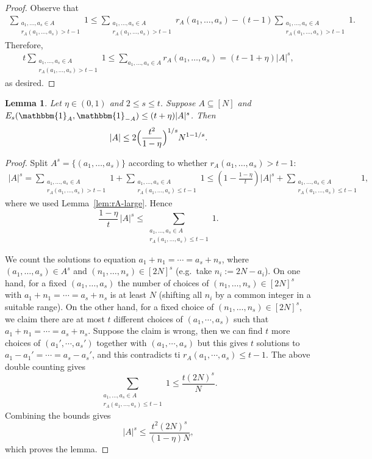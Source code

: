 \documentclass[A4paper,reqno,oneside,12pt]{amsart}
\theoremstyle{plain}
\newtheorem{lemma}[theorem]{Lemma}
\theoremstyle{definition}
\newcommand{\e}{\mathbbm{1}}          %
\begin{document}
\begin{proof}
Observe that
\begin{align*}
  \sum_{\substack{a_1,\dots,a_s\in A\\ r_{A}(a_1,\dots,a_s)>t-1}} 1 \leq \sum_{\substack{a_1,\dots,a_s\in A\\ r_{A}(a_1,\dots,a_s)>t-1}} r_A(a_1,\dots,a_s) -(t-1)\sum_{\substack{a_1,\dots,a_s\in A\\ r_{A}(a_1,\dots,a_s)>t-1}} 1.
\end{align*}
Therefore,
\begin{align*}
t\sum_{\substack{a_1,\dots,a_s\in A\\ r_{A}(a_1,\dots,a_s)>t-1}} 1 \leq \sum_{a_1,\dots,a_s\in A} r_A(a_1,\dots,a_s)=(t-1+\eta)|A|^s,
\end{align*}
as desired.
\end{proof}

\begin{lemma}\label{lem: upper bound on A} Let $\eta\in(0,1)$  and $2\le s\le t$.
Suppose $A\subseteq [N]$ and $E_s(\e_A,\e_{-A})\leq (t+\eta)|A|^s$. Then
\[
|A|\leq 2\Bigl(\frac{t^2}{1-\eta}\Bigr)^{1/s}N^{1-1/s}.
\]
\end{lemma}

\begin{proof}
Split $A^s=\{(a_1, \dots, a_s)\}$ according to whether $r_A(a_1,\dots,a_s)>t-1$:
\begin{align*}
|A|^{s} =\sum_{\substack{a_1,\dots,a_s\in A\\ r_A(a_1,\dots,a_s)>t-1}} 1
+\sum_{\substack{a_1,\dots,a_s\in A\\ r_A(a_1,\dots,a_s)\le t-1}} 1 \le \left(1-\frac{1-\eta}{t}\right) |A|^{s}
+\sum_{\substack{a_1,\dots,a_s\in A\\ r_A(a_1,\dots,a_s)\le t-1}} 1,
\end{align*}
where we used Lemma~\ref{lem:rA-large}. Hence
\[
\frac{1-\eta}{t}\,|A|^s
\le \sum_{\substack{a_1,\dots,a_s\in A\\ r_A(a_1,\dots,a_s)\le t-1}} 1.
\]

We count the solutions to 
equation $a_1+n_1=\cdots=a_s+n_s$, where $(a_1,\dots,a_s)\in A^s$ and $(n_1,\dots,n_s)\in [2N]^s$ 
(e.g.\ take $n_i:=2N-a_i$).
On one hand, for a fixed $(a_1,\dots,a_s)$ the number of choices of $(n_1,\dots,n_s)\in [2N]^{s}$ with $a_1+n_1=\cdots=a_s+n_s$ is at least $N$ (shifting all $n_i$ by a common integer in a suitable range). On the other hand, for a fixed choice of $(n_1,\dots,n_s)\in [2N]^{s}$, we claim there are at most $t$ different choices of $(a_1, \cdots, a_s)$ such that $a_1+n_1 = \cdots = a_s+n_s$. Suppose the claim is wrong, then we can find $t$ more choices of $(a_1', \cdots, a_s')$ together with $(a_1, \cdots, a_s)$ but this gives $t$ solutions to $a_1 - a_1' = \cdots =a_s - a_s'$, and this contradicts ti $r_A(a_1, \cdots, a_s)\le t-1$.
The above double counting gives
\[
\sum_{\substack{a_1,\dots,a_s\in A\\ r_A(a_1,\dots,a_s)\le t-1}} 1
\le \frac{t(2N)^s}{N}.
\]
Combining the bounds gives
\[
|A|^s \le \frac{t^2(2N)^s}{(1-\eta)N},
\]
which proves the lemma.
\end{proof}
\end{document}

